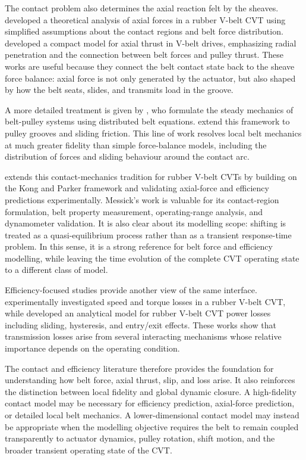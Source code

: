 \documentclass[11pt]{report}
\numberwithin{equation}{section}
\newcounter{assump}
\begin{document}
The contact problem also determines the axial reaction felt by the sheaves. \citet{KimKim1989} developed a theoretical analysis of axial forces in a rubber V-belt CVT using simplified assumptions about the contact regions and belt force distribution. \citet{Sorge1996} developed a compact model for axial thrust in V-belt drives, emphasizing radial penetration and the connection between belt forces and pulley thrust. These works are useful because they connect the belt contact state back to the sheave force balance: axial force is not only generated by the actuator, but also shaped by how the belt seats, slides, and transmits load in the groove.

A more detailed treatment is given by \citet{KongParker2005}, who formulate the steady mechanics of belt-pulley systems using distributed belt equations. \citet{KongParker2006} extend this framework to pulley grooves and sliding friction. This line of work resolves local belt mechanics at much greater fidelity than simple force-balance models, including the distribution of forces and sliding behaviour around the contact arc.

\citet{Messick2018} extends this contact-mechanics tradition for rubber V-belt CVTs by building on the Kong and Parker framework and validating axial-force and efficiency predictions experimentally. Messick's work is valuable for its contact-region formulation, belt property measurement, operating-range analysis, and dynamometer validation. It is also clear about its modelling scope: shifting is treated as a quasi-equilibrium process rather than as a transient response-time problem. In this sense, it is a strong reference for belt force and efficiency modelling, while leaving the time evolution of the complete CVT operating state to a different class of model.

Efficiency-focused studies provide another view of the same interface. \citet{ChenLeeSung1998} experimentally investigated speed and torque losses in a rubber V-belt CVT, while \citet{Bertini2014} developed an analytical model for rubber V-belt CVT power losses including sliding, hysteresis, and entry/exit effects. These works show that transmission losses arise from several interacting mechanisms whose relative importance depends on the operating condition.

The contact and efficiency literature therefore provides the foundation for understanding how belt force, axial thrust, slip, and loss arise. It also reinforces the distinction between local fidelity and global dynamic closure. A high-fidelity contact model may be necessary for efficiency prediction, axial-force prediction, or detailed local belt mechanics. A lower-dimensional contact model may instead be appropriate when the modelling objective requires the belt to remain coupled transparently to actuator dynamics, pulley rotation, shift motion, and the broader transient operating state of the CVT.
\end{document}
